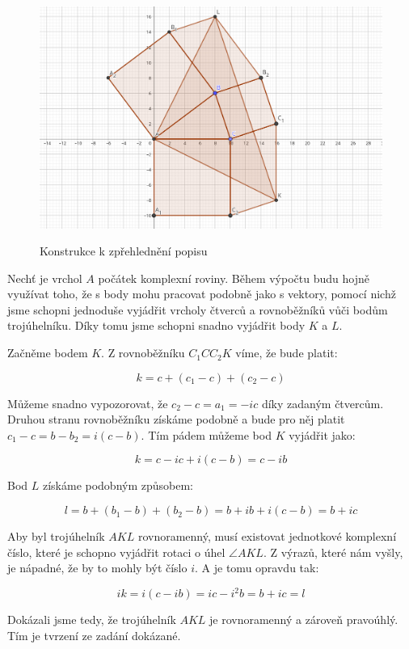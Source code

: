 \documentclass{fkssolpub}
\author{Ondřej Sedláček}
\begin{document}
 

\begin{figure}[h!]
  \centering
  \includegraphics[width=\textwidth]{1-fig.png}
  \label{fig:1}
  \caption{Konstrukce k zpřehlednění popisu}
\end{figure}

Nechť je vrchol $A$ počátek komplexní roviny. Během výpočtu
budu hojně využívat toho, že s body mohu pracovat podobně jako s
vektory, pomocí nichž jsme schopni jednoduše vyjádřit vrcholy
čtverců a rovnoběžníků vůči bodům trojúhelníku. Díky tomu jsme
schopni snadno vyjádřit body $K$ a $L$.

Začněme bodem $K$. Z rovnoběžníku $C_1CC_2K$ víme, že bude platit:

\[
  k = c + (c_1 - c) + (c_2 - c)
\]

Můžeme snadno vypozorovat, že $c_2 - c = a_1 = -ic$ díky zadaným čtvercům.
Druhou stranu rovnoběžníku získáme podobně a bude pro něj platit
$c_1 - c = b - b_2 = i(c - b)$. Tím pádem můžeme bod $K$ vyjádřit jako:

\[
  k = c - ic + i(c - b) = c - ib
\]

Bod $L$ získáme podobným způsobem:

\[
  l = b + (b_1 - b) + (b_2 - b) = b + ib + i(c - b) = b + ic
\]

Aby byl trojúhelník $AKL$ rovnoramenný, musí existovat jednotkové komplexní 
číslo, které je schopno vyjádřit rotaci o úhel $\angle AKL$. Z výrazů,
které nám vyšly, je nápadné, že by to mohly být číslo $i$. A je tomu opravdu
tak:

\[
  ik = i(c - ib) = ic - i^2 b = b + ic = l
\]

Dokázali jsme tedy, že trojúhelník $AKL$ je rovnoramenný a zároveň
pravoúhlý. Tím je tvrzení ze zadání dokázané.
\end{document}
